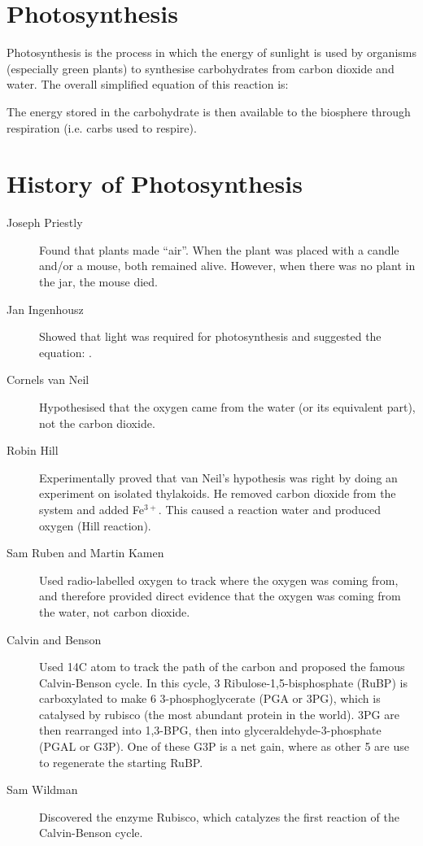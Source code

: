 \section{Photosynthesis}

Photosynthesis is the process in which the energy of sunlight is used by organisms (especially green plants) to synthesise carbohydrates from carbon dioxide and water.
The overall simplified equation of this reaction is:

The energy stored in the carbohydrate is then available to the biosphere through respiration (i.e. carbs used to respire).

\section{History of Photosynthesis}
\begin{description}
\item[Joseph Priestly] Found that plants made ``air''.
When the plant was placed with a candle and/or a mouse, both remained alive.
However, when there was no plant in the jar, the mouse died.
\item[Jan Ingenhousz] Showed that light was required for photosynthesis and suggested the equation: .
\item[Cornels van Neil] Hypothesised that the oxygen came from the water (or its equivalent part), not the carbon dioxide.
\item[Robin Hill] Experimentally proved that van Neil's hypothesis was right by doing an experiment on isolated thylakoids.
He removed carbon dioxide from the system and added Fe$^{3+}$.
This caused a reaction water and produced oxygen (Hill reaction).
\item[Sam Ruben and Martin Kamen] Used radio-labelled oxygen to track where the oxygen was coming from, and therefore provided direct evidence that the oxygen was coming from the water, not carbon dioxide.
\item[Calvin and Benson] Used 14C atom to track the path of the carbon and proposed the famous Calvin-Benson cycle.
In this cycle, 3 Ribulose-1,5-bisphosphate (RuBP) is carboxylated to make 6 3-phosphoglycerate (PGA or 3PG), which is catalysed by rubisco (the most abundant protein in the world).
3PG are then rearranged into 1,3-BPG, then into glyceraldehyde-3-phosphate (PGAL or G3P).
One of these G3P is a net gain, where as other 5 are use to regenerate the starting RuBP.
\item[Sam Wildman] Discovered the enzyme Rubisco, which catalyzes the first reaction of the Calvin-Benson cycle.
\end{description}

